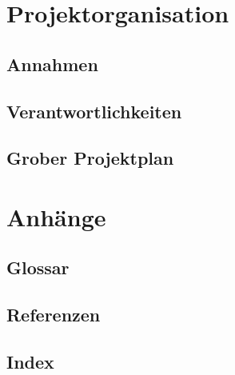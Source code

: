 \section{Projektorganisation}

	\subsection{Annahmen}
	
	\subsection{Verantwortlichkeiten}
	
	\subsection{Grober Projektplan}
	

\section{Anhänge}

	\subsection{Glossar}
	
	\subsection{Referenzen}
	
	\subsection{Index}
